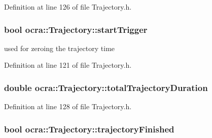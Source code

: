 Definition at line 126 of file Trajectory.\+h.

\subsubsection[{\texorpdfstring{start\+Trigger}{startTrigger}}]{\setlength{\rightskip}{0pt plus 5cm}bool ocra\+::\+Trajectory\+::start\+Trigger\hspace{0.3cm}{\ttfamily [protected]}}\hypertarget{classocra_1_1Trajectory_af07103499262cbe56eba69a713e4f3b3}{}\label{classocra_1_1Trajectory_af07103499262cbe56eba69a713e4f3b3}
used for zeroing the trajectory time 

Definition at line 121 of file Trajectory.\+h.

\subsubsection[{\texorpdfstring{total\+Trajectory\+Duration}{totalTrajectoryDuration}}]{\setlength{\rightskip}{0pt plus 5cm}double ocra\+::\+Trajectory\+::total\+Trajectory\+Duration\hspace{0.3cm}{\ttfamily [protected]}}\hypertarget{classocra_1_1Trajectory_a80c47706872b560842956d0b39a15518}{}\label{classocra_1_1Trajectory_a80c47706872b560842956d0b39a15518}


Definition at line 128 of file Trajectory.\+h.

\subsubsection[{\texorpdfstring{trajectory\+Finished}{trajectoryFinished}}]{\setlength{\rightskip}{0pt plus 5cm}bool ocra\+::\+Trajectory\+::trajectory\+Finished\hspace{0.3cm}{\ttfamily [protected]}}\hypertarget{classocra_1_1Trajectory_ae3367f25d52a9b411a86f75a7b7d06ca}{}\label{classocra_1_1Trajectory_ae3367f25d52a9b411a86f75a7b7d06ca}


